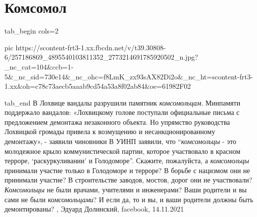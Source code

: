  
 
 
 
 
\chapter{Комсомол}


\ifcmt
  tab_begin cols=2

    pic https://scontent-frt3-1.xx.fbcdn.net/v/t39.30808-6/257186869_4895540103811352_2773214691785920502_n.jpg?_nc_cat=104&ccb=1-5&_nc_sid=730e14&_nc_ohc=f8LmK_zx93sAX82Di2o&_nc_ht=scontent-frt3-1.xx&oh=c78c73aecb5aaab9cd54a53a8f02ab84&oe=61982F02

  tab_end
\fi
В Лохвице вандалы разрушили памятник \emph{комсомольцам}. Минпамяти поддержало
вандалов: «Лохвицкому голове поступали официальные письма с предложением
демонтажа незаконного объекта. Но упрямство руководства Лохвицкой громады
привела к возмущению и несанкционированному демонтажу», - заявили чиновники В
УИНП заявили, что \enquote{\emph{комсомольцы} - это молодежное крыло коммунистической
партии, которое участвовало в красном терроре, \enquote{раскуркуливании} и
Голодоморе}.  Скажите, пожалуйста, а \emph{комсомольцы} принимали участие только в
Голодоморе и терроре?  В борьбе с нацизмом они не принимали участие? В
строительстве заводов, мостов, дорог они не участвовали? \emph{Комсомольцы} не были
врачами, учителями и инженерами?  Ваши родители и вы сами не были
\emph{комсомольцами}? И если да, то и вы, и ваши родители должны быть демонтированы?
, Эдуард Долинский, 
facebook, 14.11.2021
